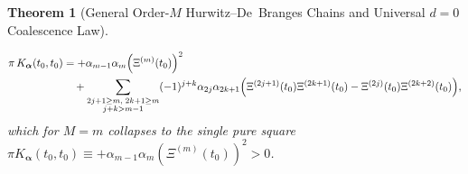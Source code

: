 \documentclass[11pt,reqno]{amsart}
\newtheorem{theorem}{Theorem}[section]
\theoremstyle{definition}
\theoremstyle{remark}
\numberwithin{equation}{section}
\begin{document}
\begin{theorem}[General Order-$M$ Hurwitz--De~Branges Chains and Universal $d=0$ Coalescence Law]
\begin{enumerate}[label=\textup{(\roman*)},leftmargin=2.2em]
\begin{equation}\label{eq:universal_hurwitz_coalescence}
\begin{aligned}
\pi\,K_{\boldsymbol{\alpha}}(t_0, t_0) &= +\alpha_{m-1}\alpha_m\Bigl(\Xi^{(m)}(t_0)\Bigr)^2 \\
&\quad + \sum_{\substack{2j+1 \ge m,\; 2k+1 \ge m \\ j+k > m-1}} (-1)^{j+k}\alpha_{2j}\alpha_{2k+1}\Bigl(\Xi^{(2j+1)}(t_0)\Xi^{(2k+1)}(t_0) - \Xi^{(2j)}(t_0)\Xi^{(2k+2)}(t_0)\Bigr),
\end{aligned}
\end{equation}
which for $M = m$ collapses to the single pure square $\pi K_{\boldsymbol{\alpha}}(t_0, t_0) \equiv +\alpha_{m-1}\alpha_m(\Xi^{(m)}(t_0))^2 > 0$.
\end{enumerate}
\end{theorem}
\end{document}

